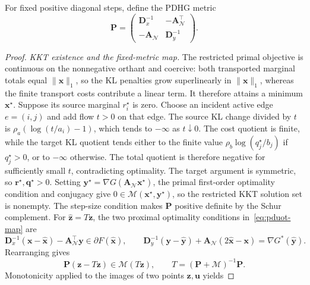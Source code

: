 For fixed positive diagonal steps, define the PDHG metric
\begin{equation*}
\mathbf{P}=\begin{pmatrix}\mathbf{D}_x^{-1}&-\mathbf{A}_{\mathcal N}^\top\\-\mathbf{A}_{\mathcal N}&\mathbf{D}_y^{-1}\end{pmatrix}.
\end{equation*}

\begin{proof}
\textit{KKT existence and the fixed-metric map.}
The restricted primal objective is continuous on the nonnegative orthant and coercive: both transported marginal totals equal $\|\mathbf x\|_1$, so the KL penalties grow superlinearly in $\|\mathbf x\|_1$, whereas the finite transport costs contribute a linear term.
It therefore attains a minimum $\mathbf x^\star$.
Suppose its source marginal $r_i^\star$ is zero.
Choose an incident active edge $e=(i,j)$ and add flow $t>0$ on that edge.
The source KL change divided by $t$ is $\rho_a(\log(t/a_i)-1)$, which tends to $-\infty$ as $t\downarrow0$.
The cost quotient is finite, while the target KL quotient tends either to the finite value $\rho_b\log(q_j^\star/b_j)$ if $q_j^\star>0$, or to $-\infty$ otherwise.
The total quotient is therefore negative for sufficiently small $t$, contradicting optimality.
The target argument is symmetric, so $\mathbf{r}^\star,\mathbf{q}^\star>0$.
Setting $\mathbf y^\star=\nabla G(\mathbf A_{\mathcal N}\mathbf x^\star)$, the primal first-order optimality condition and conjugacy give $0\in\mathcal M(\mathbf x^\star,\mathbf y^\star)$, so the restricted KKT solution set is nonempty.
The step-size condition makes $\mathbf P$ positive definite by the Schur complement.
For $\widehat{\mathbf{z}}=T\mathbf{z}$, the two proximal optimality conditions in~\eqref{eq:pduot-map} are
\begin{equation*}
\mathbf{D}_x^{-1}(\mathbf{x}-\widehat{\mathbf{x}})-\mathbf{A}_{\mathcal N}^\top \mathbf{y}\in\partial F(\widehat{\mathbf{x}}),\qquad
\mathbf{D}_y^{-1}(\mathbf{y}-\widehat{\mathbf{y}})+\mathbf{A}_{\mathcal N}(2\widehat{\mathbf{x}}-\mathbf{x})=\nabla G^*(\widehat{\mathbf{y}}).
\end{equation*}
Rearranging gives
\begin{equation}
\label{eq:pduot-resolvent}
\mathbf{P}(\mathbf{z}-T\mathbf{z})\in\mathcal M(T\mathbf{z}),\qquad T=(\mathbf{P}+\mathcal M)^{-1}\mathbf{P}.
\end{equation}
Monotonicity applied to the images of two points $\mathbf{z},\mathbf{u}$ yields

\end{proof}
